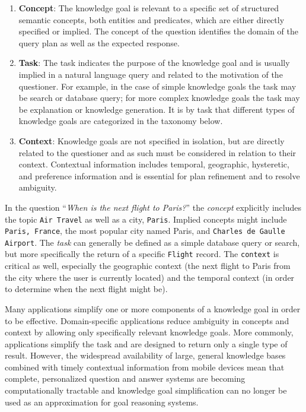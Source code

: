 \documentclass[11pt,letterpaper]{article}
\begin{document}
\begin{enumerate}

\item \textbf{Concept}: The knowledge goal is relevant to a specific set of structured semantic concepts, both entities and predicates, which are either directly specified or implied. The concept of the question identifies the domain of the query plan as well as the expected response.

\item \textbf{Task}: The task indicates the purpose of the knowledge goal and is usually implied in a natural language query and related to the motivation of the questioner. For example, in the case of simple knowledge goals the task may be search or database query; for more complex knowledge goals the task may be explanation or knowledge generation. It is by task that different types of knowledge goals are categorized in the taxonomy below.

\item \textbf{Context}: Knowledge goals are not specified in isolation, but are directly related to the questioner and as such must be considered in relation to their context. Contextual information includes temporal, geographic, hysteretic, and preference information and is essential for plan refinement and to resolve ambiguity.
\end{enumerate}

In the question ``\textit{When is the next flight to Paris?}'' the \textit{concept} explicitly includes the topic \texttt{Air Travel} as well as a city, \texttt{Paris}. Implied concepts might include \texttt{Paris, France}, the most popular city named Paris, and \texttt{Charles de Gaulle Airport}. The \textit{task} can generally be defined as a simple database query or search, but more specifically the return of a specific \texttt{Flight} record. The \texttt{context} is critical as well, especially the geographic context (the next flight to Paris from the city where the user is currently located) and the temporal context (in order to determine when the next flight might be).

Many applications simplify one or more components of a knowledge goal in order to be effective. Domain-specific applications reduce ambiguity in concepts and context by allowing only specifically relevant knowledge goals. More commonly, applications simplify the task and are designed to return only a single type of result. However, the widespread availability of large, general knowledge bases combined with timely contextual information from mobile devices mean that complete, personalized question and answer systems are becoming computationally tractable and knowledge goal simplification can no longer be used as an approximation for goal reasoning systems.
\end{document}
